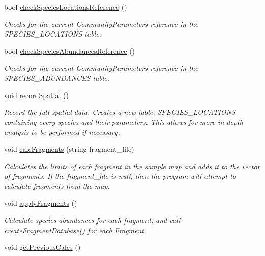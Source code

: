 \begin{DoxyCompactItemize}
bool \hyperlink{group___community_objects_a23b9398df3a63c75d01e3ed3982432c2}{check\+Species\+Locations\+Reference} ()
\begin{DoxyCompactList}\small\item\em Checks for the current Community\+Parameters reference in the S\+P\+E\+C\+I\+E\+S\+\_\+\+L\+O\+C\+A\+T\+I\+O\+NS table. \end{DoxyCompactList}\item 
bool \hyperlink{group___community_objects_a5b2236c98b613c0ec96998bd932101f5}{check\+Species\+Abundances\+Reference} ()
\begin{DoxyCompactList}\small\item\em Checks for the current Community\+Parameters reference in the S\+P\+E\+C\+I\+E\+S\+\_\+\+A\+B\+U\+N\+D\+A\+N\+C\+ES table. \end{DoxyCompactList}\item 
void \hyperlink{group___community_objects_a08be240fddc6ea481014567276a84dd0}{record\+Spatial} ()\hypertarget{group___community_objects_a08be240fddc6ea481014567276a84dd0}{}\label{group___community_objects_a08be240fddc6ea481014567276a84dd0}

\begin{DoxyCompactList}\small\item\em Record the full spatial data. Creates a new table, S\+P\+E\+C\+I\+E\+S\+\_\+\+L\+O\+C\+A\+T\+I\+O\+NS containing every species and their parameters. This allows for more in-\/depth analysis to be performed if necessary. \end{DoxyCompactList}\item 
void \hyperlink{group___community_objects_ac9433a0c34911ec1128b5459f61488fc}{calc\+Fragments} (string fragment\+\_\+file)
\begin{DoxyCompactList}\small\item\em Calculates the limits of each fragment in the sample map and adds it to the vector of fragments. If the fragment\+\_\+file is null, then the program will attempt to calculate fragments from the map. \end{DoxyCompactList}\item 
void \hyperlink{group___community_objects_a706aba5b07c98849cb2b4b0318488f99}{apply\+Fragments} ()\hypertarget{group___community_objects_a706aba5b07c98849cb2b4b0318488f99}{}\label{group___community_objects_a706aba5b07c98849cb2b4b0318488f99}

\begin{DoxyCompactList}\small\item\em Calculate species abundances for each fragment, and call create\+Fragment\+Database() for each Fragment. \end{DoxyCompactList}\item 
void \hyperlink{group___community_objects_a24c425f32b1e3b10227e2d04cbacfe31}{get\+Previous\+Calcs} ()\hypertarget{group___community_objects_a24c425f32b1e3b10227e2d04cbacfe31}{}\label{group___community_objects_a24c425f32b1e3b10227e2d04cbacfe31}


\end{DoxyCompactItemize}

